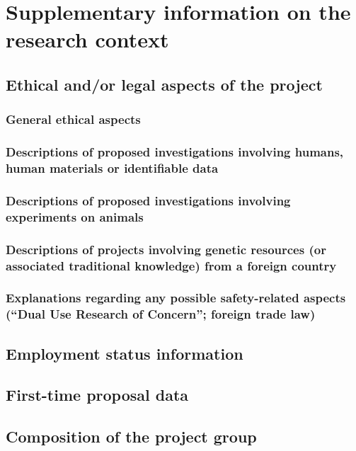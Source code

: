 \documentclass{scrartcl}
\begin{document}
\printbibliography[heading=none]


\section{Supplementary information on the research context}

\subsection{Ethical and/or legal aspects of the project}

\subsubsection{General ethical aspects}

\subsubsection{Descriptions of proposed investigations involving humans, human materials or identifiable data}

\subsubsection{Descriptions of proposed investigations involving experiments on animals}

\subsubsection{Descriptions of projects involving genetic resources (or associated traditional knowledge) from a foreign country}

\subsubsection{Explanations regarding any possible safety-related aspects (``Dual Use Research of Concern''; foreign trade law)}

\subsection{Employment status information}

\subsection{First-time proposal data}

\subsection{Composition of the project group}
\end{document}
